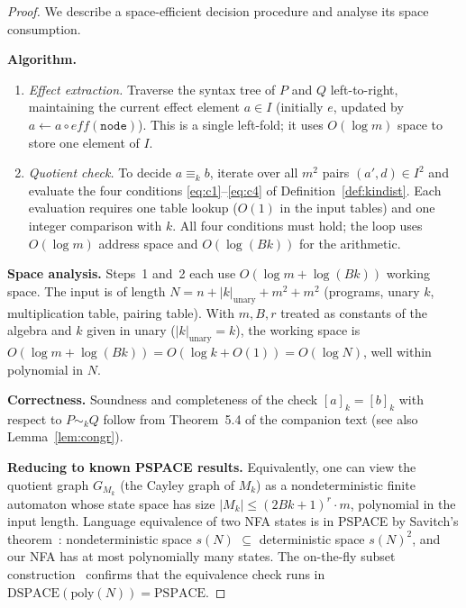\begin{proof}
We describe a space-efficient decision procedure and analyse its
space consumption.

\medskip\noindent
\textbf{Algorithm.}
\begin{enumerate}
\item \emph{Effect extraction.}  Traverse the syntax tree of $P$ and
      $Q$ left-to-right, maintaining the current effect element
      $a\in I$ (initially $e$, updated by $a \leftarrow a{\circ}
      \mathit{eff}(\mathtt{node})$).  This is a single left-fold; it
      uses $O(\log m)$ space to store one element of $I$.
\item \emph{Quotient check.}  To decide $a\equiv_k b$, iterate over
      all $m^2$ pairs $(a',d)\in I^2$ and evaluate the four
      conditions \eqref{eq:c1}--\eqref{eq:c4} of
      Definition~\ref{def:kindist}.  Each evaluation requires one
      table lookup ($O(1)$ in the input tables) and one integer
      comparison with $k$.  All four conditions must hold; the loop
      uses $O(\log m)$ address space and $O(\log(Bk))$ for the
      arithmetic.
\end{enumerate}

\medskip\noindent
\textbf{Space analysis.}
Steps~1 and~2 each use $O(\log m + \log(Bk))$ working space.  The
input is of length $N = n + |k|_{\mathrm{unary}} + m^2 + m^2$
(programs, unary $k$, multiplication table, pairing table).  With
$m,B,r$ treated as constants of the algebra and $k$ given in unary
($|k|_{\mathrm{unary}} = k$), the working space is
$O(\log m + \log(Bk)) = O(\log k + O(1)) = O(\log N)$, well within
polynomial in $N$.

\medskip\noindent
\textbf{Correctness.}
Soundness and completeness of the check
$[a]_k = [b]_k$ with respect to $P\sim_k Q$ follow from
Theorem~5.4 of the companion text (see also
Lemma~\ref{lem:congr}).

\medskip\noindent
\textbf{Reducing to known PSPACE results.}
Equivalently, one can view the quotient graph $G_{M_k}$ (the Cayley
graph of $M_k$) as a nondeterministic finite automaton whose state
space has size $|M_k|\le (2Bk+1)^r\cdot m$, polynomial in the
input length.  Language equivalence of two NFA states is in PSPACE
by Savitch's theorem~\cite{Sipser2013}: nondeterministic space
$s(N)$ $\subseteq$ deterministic space $s(N)^2$, and our NFA has
at most polynomially many states.  The on-the-fly subset
construction~\cite{AroraBarak2009} confirms that the equivalence
check runs in $\text{DSPACE}(\text{poly}(N))=\text{PSPACE}$.
\end{proof}

